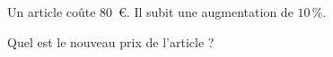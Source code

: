 
Un article coûte $80$~€. Il subit une augmentation de $10\,\%$.

Quel est le nouveau prix de l'article ?

\smallskip


